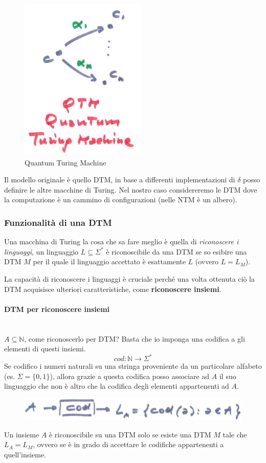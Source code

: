 \documentclass{article}
\begin{document}
\begin{figure}[H]
    \centering
    \includegraphics[scale=0.6]{images/QTM.png}
    \caption{Quantum Turing Machine}
\end{figure}

Il modello originale è quello DTM, in base a differenti implementazioni di $\delta$ posso
definire le altre macchine di Turing. Nel nostro caso considereremo le DTM dove la computazione
è un cammino di configurazioni (nelle NTM è un albero).

\subsubsection{Funzionalità di una DTM}
Una macchina di Turing la cosa che sa fare meglio è quella di \textit{riconoscere i linguaggi},
un linguaggio $L\subseteq\Sigma^*$ è riconoscibile da una DTM se so esibire una DTM $M$ per il
quale il linguaggio accettato è esattamente $L$ (ovvero $L=L_M$).

La capacità di riconoscere i linguaggi è cruciale perché una volta ottenuta ciò la DTM
acquisisce ulteriori caratteristiche, come \textbf{riconoscere insiemi}.
\paragraph{DTM per riconoscere insiemi}\mbox{}\\
$A\subseteq\mathbb{N}$, come riconoscerlo per DTM? Basta che io imponga una codifica
a gli elementi di questi insiemi.
$$cod:\mathbb{N}\rightarrow\Sigma^*$$
Se codifico i numeri naturali su una
stringa proveniente da un particolare alfabeto (es. $\Sigma=\{0,1\}$), allora grazie a questa codifica
posso associare ad $A$ il suo linguaggio che non è altro che la codifica degli elementi appartenenti ad $A$.
\begin{figure}[H]
    \centering
    \includegraphics[scale=0.5]{images/dtm_accept_a.png}
\end{figure}
Un insieme $A$ è riconoscibile su una DTM solo se esiste una DTM $M$ tale che $L_A=L_M$, ovvero
se è in grado di accettare le codifiche appartenenti a quell'insieme.
\end{document}
